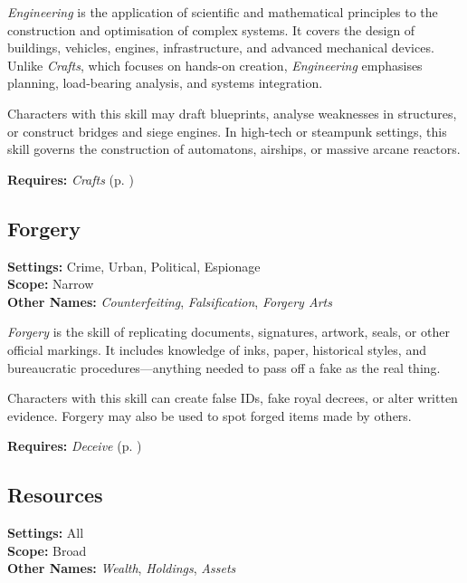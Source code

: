 \emph{Engineering} is the application of scientific and mathematical principles to the construction and optimisation of complex systems. It covers the design of buildings, vehicles, engines, infrastructure, and advanced mechanical devices. Unlike \emph{Crafts}, which focuses on hands-on creation, \emph{Engineering} emphasises planning, load-bearing analysis, and systems integration.

Characters with this skill may draft blueprints, analyse weaknesses in structures, or construct bridges and siege engines. In high-tech or steampunk settings, this skill governs the construction of automatons, airships, or massive arcane reactors.

\vspace{0.5\baselineskip}
\noindent\textbf{Requires:} \emph{Crafts} (p. \pageref{skill:crafts})




\subsection{Forgery}\label{skill:forgery}
\textbf{Settings:} Crime, Urban, Political, Espionage\\
\textbf{Scope:} Narrow\\
\textbf{Other Names:} \emph{Counterfeiting}, \emph{Falsification}, \emph{Forgery Arts}\\
\vspace{\baselineskip}

\emph{Forgery} is the skill of replicating documents, signatures, artwork, seals, or other official markings. It includes knowledge of inks, paper, historical styles, and bureaucratic procedures—anything needed to pass off a fake as the real thing.

Characters with this skill can create false IDs, fake royal decrees, or alter written evidence. Forgery may also be used to spot forged items made by others.

\vspace{0.5\baselineskip}
\noindent\textbf{Requires:} \emph{Deceive} (p. \pageref{skill:deceive})



\subsection{Resources}\label{skill:resources}
\textbf{Settings:} All\\
\textbf{Scope:} Broad\\
\textbf{Other Names:} \emph{Wealth}, \emph{Holdings}, \emph{Assets}\\
\vspace{\baselineskip}

